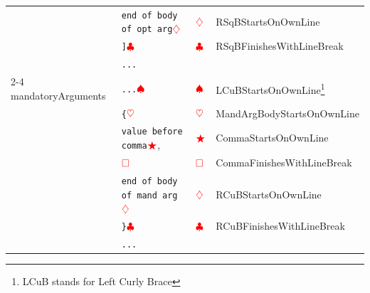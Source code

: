 \begin{longtable}{llll}
                                         & \verb!end of body of opt arg!$\color{red}\diamondsuit$                & $\color{red}\diamondsuit$                   & RSqBStartsOnOwnLine                                               \\
                                         & \verb!]!$\color{red}\clubsuit$                               & $\color{red}\clubsuit$             & RSqBFinishesWithLineBreak                                         \\
                                         & \verb!...!                                                        &                                         &                                                                   \\
  \cmidrule{2-4}
  mandatoryArguments                     & \verb!...!$\color{red}\spadesuit$                                 & $\color{red}\spadesuit$                 & LCuBStartsOnOwnLine\footnote{LCuB stands for Left Curly Brace}    \\
                                         & \verb!{!$\color{red}\heartsuit$                                    & $\color{red}\heartsuit$                  & MandArgBodyStartsOnOwnLine                                        \\
                                         & \verb!value before comma!$\color{red}\bigstar$,                  & $\color{red}\bigstar$                  & CommaStartsOnOwnLine                                              \\
                                         & $\color{red}\square$                                      & $\color{red}\square$            & CommaFinishesWithLineBreak                                        \\
                                         & \verb!end of body of mand arg!$\color{red}\diamondsuit$               & $\color{red}\diamondsuit$                   & RCuBStartsOnOwnLine                                               \\
                                         & \verb!}!$\color{red}\clubsuit$                               & $\color{red}\clubsuit$             & RCuBFinishesWithLineBreak                                         \\
                                         & \verb!...!                                                        &                                         &                                                                   \\

\end{longtable}
